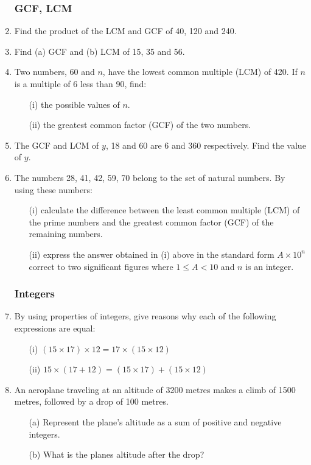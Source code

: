 \begin{enumerate}
			\subsubsection{GCF, LCM}
	\item Find the product of the LCM and GCF of 40, 120 and 240.
	
	\item Find (a) GCF and (b) LCM of 15, 35 and 56.
	
	\item Two numbers, 60 and $n$, have the lowest common multiple (LCM) of 420. If $n$ is a multiple of 6 less than 90, find:
		\begin{itemize}
		\item[(i)] the possible values of $n$.
		\item[(ii)] the greatest common factor (GCF) of the two numbers.
		\end{itemize}	
		
	\item The GCF and LCM of $y$, 18 and 60 are 6 and 360 respectively. Find the value of $y$.
		
	\item The numbers 28, 41, 42, 59, 70 belong to the set of natural numbers. By using these numbers:
		\begin{itemize}
		\item[(i)] calculate the difference between the least common multiple (LCM) of the prime numbers and the greatest common factor (GCF) of the remaining numbers.
		\item[(ii)] express the answer obtained in (i) above in the standard form $A \times 10^n$ correct to two significant figures where $1 \leq A < 10$ and $n$ is an integer.
		\end{itemize}			 
	
	
			\subsubsection{Integers}
	\item By using properties of integers, give reasons why each of the following expressions are equal:
		\begin{itemize}
		\item[(i)] $(15 \times 17) \times 12 = 17 \times (15 \times 12)$
		\item[(ii)] $15 \times (17 + 12) = (15 \times 17) + (15 \times 12)$
		\end{itemize}
		
	\item An aeroplane traveling at an altitude of 3200 metres makes a climb of 1500 metres, followed by a drop of 100 metres.
		\begin{itemize}
		\item[(a)] Represent the plane's altitude as a sum of positive and negative integers.
		\item[(b)] What is the planes altitude after the drop?
		\end{itemize}
	


\end{enumerate}

